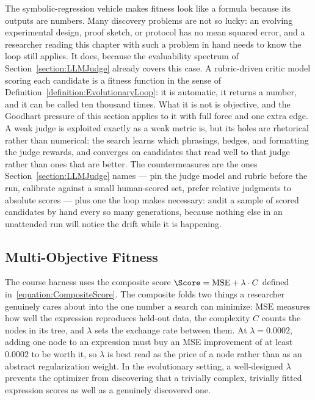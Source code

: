 The symbolic-regression vehicle makes fitness look like a formula because its outputs are numbers.
Many discovery problems are not so lucky: an evolving experimental design, proof sketch, or protocol has no mean squared error, and a researcher reading this chapter with such a problem in hand needs to know the loop still applies.
It does, because the evaluability spectrum of Section~\ref{section:LLMJudge} already covers this case.
A rubric-driven critic model scoring each candidate is a fitness function in the sense of Definition~\ref{definition:EvolutionaryLoop}: it is automatic, it returns a number, and it can be called ten thousand times.
What it is not is objective, and the Goodhart pressure of this section applies to it with full force and one extra edge.
A weak judge is exploited exactly as a weak metric is, but its holes are rhetorical rather than numerical: the search learns which phrasings, hedges, and formatting the judge rewards, and converges on candidates that read well to that judge rather than ones that are better.
The countermeasures are the ones Section~\ref{section:LLMJudge} names --- pin the judge model and rubric before the run, calibrate against a small human-scored set, prefer relative judgments to absolute scores --- plus one the loop makes necessary: audit a sample of scored candidates by hand every so many generations, because nothing else in an unattended run will notice the drift while it is happening.

\subsection{Multi-Objective Fitness}

The course harness uses the composite score $\Score = \mathrm{MSE} + \lambda \cdot C$ defined in~\eqref{equation:CompositeScore}.
The composite folds two things a researcher genuinely cares about into the one number a search can minimize: $\mathrm{MSE}$ measures how well the expression reproduces held-out data, the complexity $C$ counts the nodes in its tree, and $\lambda$ sets the exchange rate between them.
At $\lambda = 0.0002$, adding one node to an expression must buy an MSE improvement of at least $0.0002$ to be worth it, so $\lambda$ is best read as the price of a node rather than as an abstract regularization weight.
In the evolutionary setting, a well-designed $\lambda$ prevents the optimizer from discovering that a trivially complex, trivially fitted expression scores as well as a genuinely discovered one.

